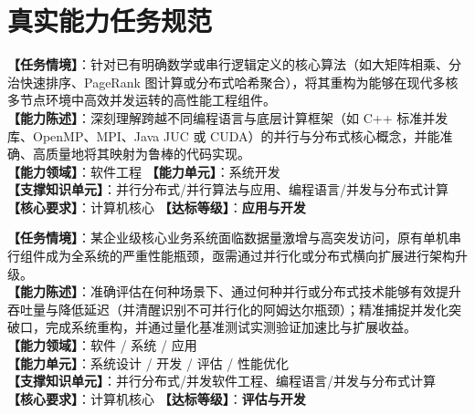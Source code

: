 \section{真实能力任务规范}

\begin{taskbox}
\textbf{【任务情境】}：针对已有明确数学或串行逻辑定义的核心算法（如大矩阵相乘、分治快速排序、PageRank 图计算或分布式哈希聚合），将其重构为能够在现代多核多节点环境中高效并发运转的高性能工程组件。\\
\textbf{【能力陈述】}：深刻理解跨越不同编程语言与底层计算框架（如 C++ 标准并发库、OpenMP、MPI、Java JUC 或 CUDA）的并行与分布式核心概念，并能准确、高质量地将其映射为鲁棒的代码实现。\\
\textbf{【能力领域】}：软件工程 \quad \textbf{【能力单元】}：系统开发\\
\textbf{【支撑知识单元】}：并行分布式/并行算法与应用、编程语言/并发与分布式计算\\
\textbf{【核心要求】}：计算机核心 \quad \textbf{【达标等级】}：\textbf{应用与开发}
\end{taskbox}

\begin{taskbox}[任务 2：通过引入并行或分布式架构突破串行系统性能瓶颈]
\textbf{【任务情境】}：某企业级核心业务系统面临数据量激增与高突发访问，原有单机串行组件成为全系统的严重性能瓶颈，亟需通过并行化或分布式横向扩展进行架构升级。\\
\textbf{【能力陈述】}：准确评估在何种场景下、通过何种并行或分布式技术能够有效提升吞吐量与降低延迟（并清醒识别不可并行化的阿姆达尔瓶颈）；精准捕捉并发化突破口，完成系统重构，并通过量化基准测试实测验证加速比与扩展收益。\\
\textbf{【能力领域】}：软件 / 系统 / 应用\\
\textbf{【能力单元】}：系统设计 / 开发 / 评估 / 性能优化\\
\textbf{【支撑知识单元】}：并行分布式/并发软件工程、编程语言/并发与分布式计算\\
\textbf{【核心要求】}：计算机核心 \quad \textbf{【达标等级】}：\textbf{评估与开发}
\end{taskbox}

